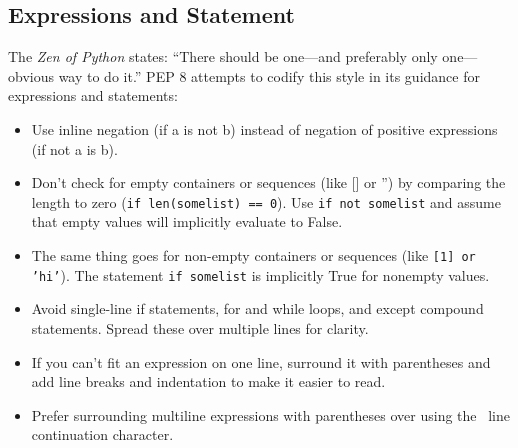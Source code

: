 \documentclass{article}
\begin{document}
\subsection{Expressions and Statement}
The \textit{Zen of Python} states: “There should be one—and preferably only
one—obvious way to do it.” PEP 8 attempts to codify this style in its
guidance for expressions and statements:
\begin{itemize}
	\item Use inline negation (if a is not b) instead of negation of positive
expressions (if not a is b).
	\item Don’t check for empty containers or sequences (like [] or '')
by comparing the length to zero (\texttt{if len(somelist) == 0}). Use
\texttt{if not somelist} and assume that empty values will implicitly
evaluate to False.
	\item The same thing goes for non-empty containers or sequences (like
\texttt{[1] or 'hi'}). The statement \texttt{if somelist} is implicitly True for nonempty
values.
	\item Avoid single-line if statements, for and while loops, and except
compound statements. Spread these over multiple lines for
clarity.
	\item If you can’t fit an expression on one line, surround it with parentheses
and add line breaks and indentation to make it easier to
read.
	\item Prefer surrounding multiline expressions with parentheses over
using the \ line continuation character.
\end{itemize}

\end{document}
